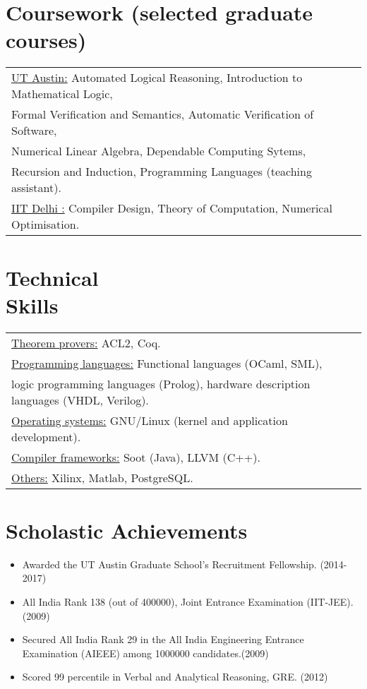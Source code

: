 \documentclass[margin]{res}
\begin{document}
\begin{resume}
\begin{itemize}
	\end{itemize}

\section{Coursework (selected graduate courses)}
\begin{tabular}{l p{3in}}
  \underline{UT Austin:} Automated Logical Reasoning, Introduction to
  Mathematical Logic, \\ Formal Verification and Semantics, Automatic
  Verification of Software,\\ Numerical Linear Algebra, Dependable
  Computing Sytems, \\Recursion and Induction, Programming Languages (teaching assistant). \\ 
  \underline{IIT Delhi :} Compiler Design,
  Theory of Computation, Numerical Optimisation.
\end{tabular}

\section{Technical \\ Skills}
   \begin{tabular}{l p{3in}}
    \underline{Theorem provers:} ACL2, Coq. \\

    \underline{Programming languages:} Functional languages (OCaml,
    SML), \\ logic programming languages (Prolog),
    hardware description languages (VHDL, Verilog). \\

    \underline{Operating systems:} GNU/Linux (kernel and application development). \\

    \underline{Compiler frameworks:} Soot (Java), LLVM (C++). \\

    \underline{Others:} Xilinx, Matlab, PostgreSQL. \\
 \end{tabular}

\section{Scholastic Achievements}
 \begin{itemize} \itemsep -2pt  %
 \item Awarded the UT Austin Graduate School's Recruitment
   Fellowship. \hfill (2014-2017)
 \item All India Rank 138 (out of 400000), Joint Entrance Examination
   (IIT-JEE). \hfill (2009)
 \item Secured All India Rank 29 in the All India Engineering Entrance
   Examination (AIEEE) among 1000000 candidates.\hfill (2009)
 \item Scored 99 percentile in Verbal and Analytical Reasoning,
   GRE. \hfill (2012)
 \end{itemize}


\end{resume}
\end{document}
